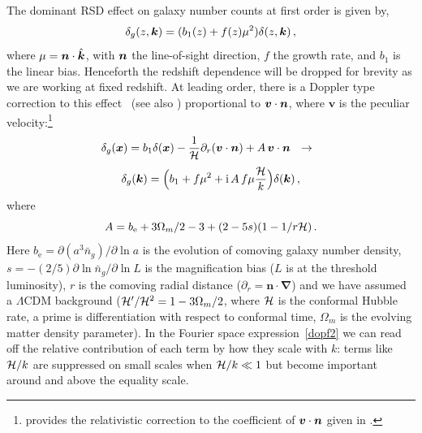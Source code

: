 The dominant RSD effect on galaxy number counts at first order is given by, 
\begin{equation}
    \delta_g(z,\bm {k}) = (b_{1}(z) + f (z) \mu^{2})\delta(z,\bm {k})\,,
\end{equation}
where $\mu=\bm {n}\cdot\hat{\bm {k}}$, with $\bm {n}$ the line-of-sight direction, $f$ the growth rate, and $b_1$ is the linear bias. Henceforth the redshift dependence will be dropped for brevity as we are working at fixed redshift. At leading order, there is a Doppler type correction to this effect~\citep{Kaiser:1987qv,McDonald:2009dh,Challinor:2011bk} (see also \citep{Raccanelli:2016avd,Hall:2016bmm,Abramo:2017xnp}) proportional to $\bm{v}\cdot\bm {n}$, where $\bm{v}$ is the peculiar velocity:\footnote{\citep{Challinor:2011bk} provides the relativistic correction to the coefficient of $\bm{v}\cdot\bm {n}$ given in \citep{Kaiser:1987qv,McDonald:2009dh}.}
\begin{equation} \label{dopf}
\delta_g(\bm {x}) = b_{1} \delta(\bm {x})-{\frac{1}{\mathcal{H}}}\partial_r(\bm{v}\cdot\bm {n}) +{A}\,\bm{v}\cdot\bm {n} ~~\to~~
\end{equation}
\begin{equation} \delta_g(\bm {k})=\Big(b_1+f\mu^2+\mathrm{i\,} {A}\,f \mu{\frac{\mathcal{H}}{k}}\Big)\delta(\bm {k})\,,\label{dopf2}
\end{equation}
where  
\begin{equation}
{A} = {b_{\textrm{e}}+{3}\Omega_m/2 -3 + (2-5s) (1-{1/ r\mathcal{H}} )}\,.
\end{equation}
Here $b_{\textrm{e}}=\partial (a^3 \bar{n}_g)/\partial \ln a$ is the evolution of comoving galaxy number density, $s=-(2/5)\partial \ln \bar{n}_g/\partial \ln L$ is the magnification bias ($L$ is at the threshold luminosity), $r$ is the comoving radial distance ($\partial_r=\bm n\cdot\bm\nabla$) and we have assumed a $\Lambda$CDM background ($\mathcal{H}'/\mathcal{H}^2=1-3\Omega_m/2$, where $\mathcal{H}$ is the conformal Hubble rate, a prime is differentiation with respect to conformal time, $\Omega_m$ is the evolving matter density parameter). In the  Fourier space expression~\eqref{dopf2} we can read off the relative contribution of each term by how they scale with $k$: terms like $\mathcal{H}/k$ are suppressed on small scales when $\mathcal{H}/k\ll1$ but become important around and above the equality scale. 

